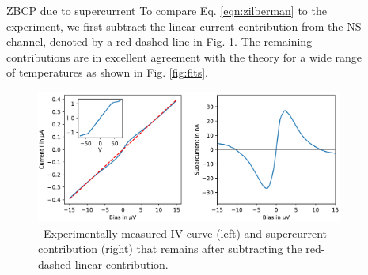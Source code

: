 \documentclass[final]{beamer}
\newlength{\sepwid}
\newlength{\onecolwid}
\begin{document}
\begin{frame}[t]
\begin{columns}[t]
\begin{column}{\onecolwid}
\begin{block}{ZBCP due to supercurrent}
To compare Eq. \ref{eqn:zilberman} to the experiment, we first subtract the
linear current contribution from the NS channel, denoted by a red-dashed line in
Fig. \ref{fig:subtraction}. The remaining contributions are in excellent agreement
with the theory for a wide range of temperatures as shown in Fig.
\ref{fig:fits}. 

\begin{figure}
	\includegraphics[width=0.89\linewidth]{fig/subtraction.pdf}
	\caption{\sffamily \, Experimentally measured IV-curve (left) and supercurrent
	contribution (right) that remains after subtracting the red-dashed
linear contribution.}
\label{fig:subtraction}
\end{figure}


\end{block}



\end{column} %

\begin{column}{\sepwid}\end{column} %

\begin{column}{\onecolwid} %



\end{column}
\end{columns}
\end{frame}
\end{document}
